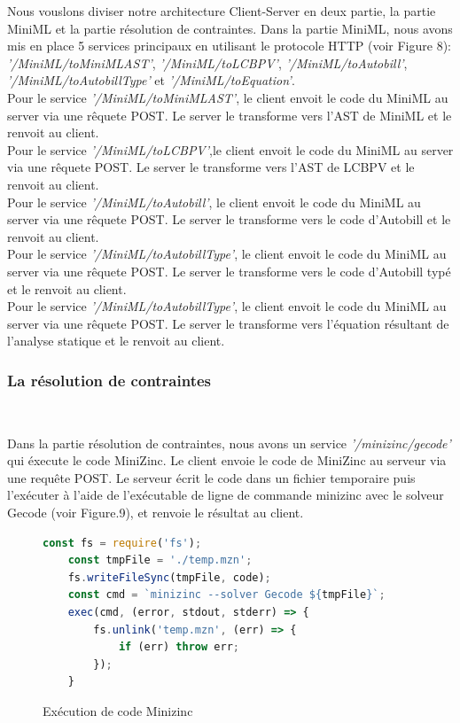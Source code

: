 \documentclass[12pt]{article}
\begin{document}
Nous vouslons diviser notre architecture Client-Server en deux partie, la partie MiniML et la partie résolution de contraintes. Dans la partie MiniML, nous avons mis en place 5 services principaux en utilisant le protocole HTTP (voir Figure 8): \emph{'/MiniML/toMiniMLAST'}, \emph{'/MiniML/toLCBPV'}, \emph{'/MiniML/toAutobill'}, \emph{'/MiniML/toAutobillType'} et \emph{'/MiniML/toEquation'}. \\
Pour le service \emph{'/MiniML/toMiniMLAST'}, le client envoit le code du MiniML au server via une rêquete POST. Le server le transforme vers l'AST de MiniML et le renvoit au client.\\
Pour le service \emph{'/MiniML/toLCBPV'},le client envoit le code du MiniML au server via une rêquete POST. Le server le transforme vers l'AST de LCBPV et le renvoit au client.\\
Pour le service \emph{'/MiniML/toAutobill'}, le client envoit le code du MiniML au server via une rêquete POST. Le server le transforme vers le code d'Autobill et le renvoit au client.\\
Pour le service \emph{'/MiniML/toAutobillType'}, le client envoit le code du MiniML au server via une rêquete POST. Le server le transforme vers le code d'Autobill typé et le renvoit au client.\\
Pour le service \emph{'/MiniML/toAutobillType'}, le client envoit le code du MiniML au server via une rêquete POST. Le server le transforme vers l'équation résultant de l'analyse statique et le renvoit au client.\\


\subsubsection{La résolution de contraintes}\

Dans la partie résolution de contraintes, nous avons un service \emph{'/minizinc/gecode'} qui éxecute le code MiniZinc. Le client envoie le code de MiniZinc au serveur via une requête POST. Le serveur écrit le code dans un fichier temporaire puis l'exécuter à l'aide de l'exécutable de ligne de commande minizinc avec le solveur Gecode (voir Figure.9), et renvoie le résultat au client.

\begin{figure}
  \centering
\begin{lstlisting}[language=javascript]
    const fs = require('fs');
    const tmpFile = './temp.mzn';
    fs.writeFileSync(tmpFile, code);
    const cmd = `minizinc --solver Gecode ${tmpFile}`;
    exec(cmd, (error, stdout, stderr) => {
        fs.unlink('temp.mzn', (err) => {
            if (err) throw err;
        });
    }
\end{lstlisting}
\caption{Exécution de code Minizinc}
\end{figure}
\end{document}
